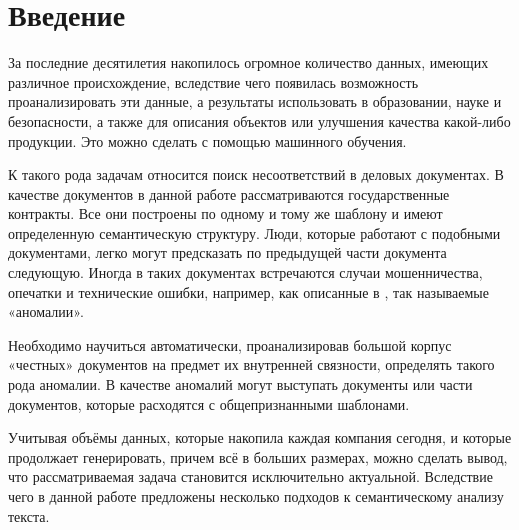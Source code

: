 \documentclass[14pt]{matmex-diploma-custom}
\begin{document}

\maketitle{}
\tableofcontents



\section*{Введение}
За последние десятилетия накопилось огромное количество данных, имеющих различное происхождение, вследствие чего появилась возможность проанализировать эти данные, а результаты использовать в образовании, науке и безопасности, а также для описания объектов или улучшения качества какой-либо продукции. Это можно сделать с помощью машинного обучения. 

К такого рода задачам относится поиск несоответствий в деловых документах. В качестве документов в данной работе рассматриваются государственные контракты. Все они построены по одному и тому же шаблону и имеют определенную семантическую структуру. Люди, которые работают с подобными документами, легко могут предсказать по предыдущей части документа следующую. Иногда в таких документах встречаются случаи мошенничества, опечатки и технические ошибки, например, как описанные в \cite{vedomosti,fontanka}, так называемые «аномалии». 

Необходимо научиться автоматически, проанализировав большой корпус «честных» документов на предмет их внутренней связности, определять такого рода аномалии. В качестве аномалий могут выступать документы или части документов, которые расходятся с общепризнанными шаблонами.

Учитывая объёмы данных, которые накопила каждая компания сегодня, и которые продолжает генерировать, причем всё в больших размерах, можно сделать вывод, что рассматриваемая задача становится исключительно актуальной. Вследствие чего в данной работе предложены несколько подходов к семантическому анализу текста. 
\end{document}
